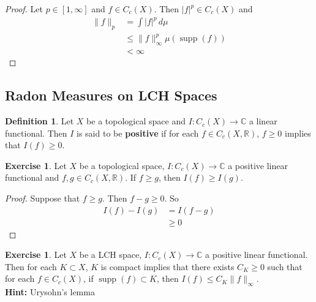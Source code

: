 \documentclass[12pt]{amsart}
\theoremstyle{definition}
\newtheorem{defn}[definition]{Definition}
\newtheorem{ex}[definition]{Exercise}
\newcommand{\C}{\mathbb{C}}
\newcommand{\R}{\mathbb{R}}
\newcommand{\dmu}{\, d \mu}
\DeclareMathOperator{\supp}{supp}
\newcommand{\lex}[1]{\label{ex:#1}}
\newcommand{\ld}[1]{\label{defn:#1}}
\begin{document}
	\begin{proof}
	Let $p \in [1, \infty]$ and $f \in C_c(X)$. Then $|f|^p \in C_c(X)$ and 
	\begin{align*}
	\|f\|_p 
	&= \int |f|^p \dmu \\
	& \leq \|f\|_{\infty}^p \mu(\supp (f)) \\
	& < \infty
\end{align*}	 
	\end{proof}
	
	
	
	
	
	
	
	
	
	
	
	
	\newpage	
	\subsection{Radon Measures on LCH Spaces}
	
	\begin{defn} \ld{00000} 
	Let $X$ be a topological space and $I: C_c(X) \rightarrow \C$ a linear functional. Then $I$ is said to be \textbf{positive} if for each $f \in C_c(X, \R)$, $f \geq 0 $ implies that $I(f) \geq 0$.
	\end{defn}
	
	\begin{ex} \lex{00000} 
	Let $X$ be a topological space, $I: C_c(X) \rightarrow \C$ a positive linear functional and $f,g \in C_c(X, \R)$. If $f \geq g$, then $I(f) \geq I (g)$.  
	\end{ex}	
	
	\begin{proof}
	Suppose that $f \geq g$. Then $f - g \geq 0$. So 
	\begin{align*}
	I(f) - I(g) 
	&= I(f -g) \\
	&\geq 0
	\end{align*}
	\end{proof}
	
	
	
	\begin{ex} \lex{00000} 
	Let $X$ be a LCH space, $I: C_c(X) \rightarrow \C$ a positive linear functional. Then for each $K \subset X$, $K $ is compact implies that there exists $C_K \geq 0$ such that for each $f \in C_c(X)$, if $\supp(f) \subset K$, then $I(f) \leq C_K \|f\|_{\infty}$.\\
	\textbf{Hint:} Urysohn's lemma 
	\end{ex}
	
\end{document}
